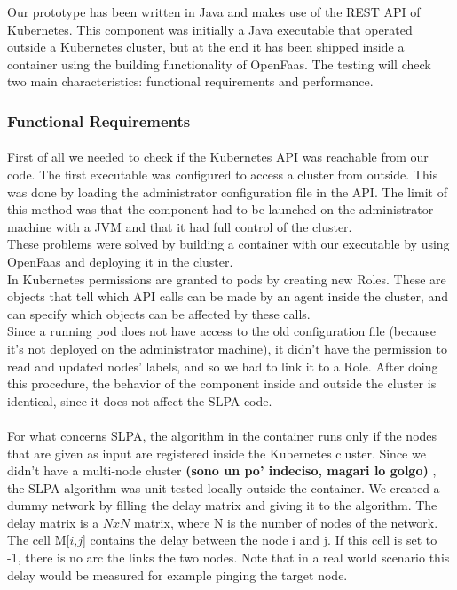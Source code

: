 Our prototype has been written in Java and makes use of the REST API of Kubernetes. 
This component was initially a Java executable that operated outside a Kubernetes cluster,
but at the end it has been shipped inside a container using the building functionality of OpenFaas.
The testing will check two main characteristics: functional requirements and performance.  
\\
\subsubsection*{Functional Requirements}
\paragraph{}
First of all we needed to check if the Kubernetes API was reachable from our code.
The first executable was configured to access a cluster from outside. This was done by loading
the administrator configuration file in the API.
The limit of this method was that the component had to be launched on the administrator machine with a JVM
and that it had full control of the cluster. 
\\
These problems were solved by building a container with our executable by using OpenFaas and deploying it
in the cluster.
\\
In Kubernetes permissions are granted to pods by creating new Roles. These are objects that tell which API 
calls can be made by an agent inside the cluster, and can specify which objects can be affected by these calls.
\\
Since a running pod does not have access to the old configuration file (because it's not deployed on the administrator machine),
it didn't have the permission to read and updated nodes' labels, and so we had to link it to a Role.
After doing this procedure, the behavior of the component inside and outside the cluster is identical,
since it does not affect the SLPA code.
\paragraph{}
For what concerns SLPA, the algorithm in the container runs only if the nodes that
are given as input are registered inside the Kubernetes cluster.
Since we didn't have a multi-node cluster \textbf{(sono un po' indeciso, magari lo golgo)}
, the SLPA algorithm was unit tested locally outside the container.
We created a dummy network by filling the delay matrix and giving it to the algorithm.
The delay matrix is a  $NxN$ matrix, where N is the number of nodes of the network.
The cell M[$i$,$j$] contains the delay between the node i and j. If this
cell is set to -1, there is no arc the links the two nodes. 
Note that in a real world scenario this delay would be measured for example pinging the target node.
\\






